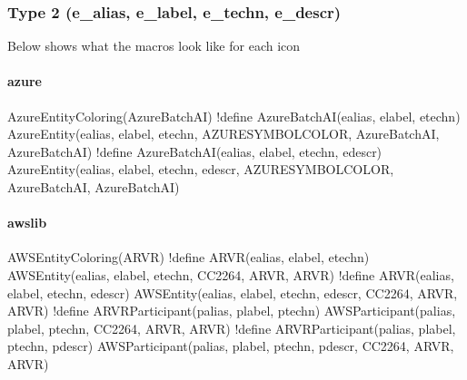 \documentclass[letterpaper,10pt,english]{sphinxmanual}
\begin{document}
\subsubsection{Type 2 (e\_alias, e\_label, e\_techn, e\_descr)}
\label{\detokenize{Stdlib/StdLibOverview:type-2-e-alias-e-label-e-techn-e-descr}}
Below shows what the macros look like for each icon


\paragraph{azure}
\label{\detokenize{Stdlib/StdLibOverview:azure}}

\begin{sphinxVerbatim}[commandchars=\\\{\}]
AzureEntityColoring(AzureBatchAI)
!define AzureBatchAI(e\PYGZus{}alias, e\PYGZus{}label, e\PYGZus{}techn) AzureEntity(e\PYGZus{}alias, e\PYGZus{}label, e\PYGZus{}techn, AZURE\PYGZus{}SYMBOL\PYGZus{}COLOR, AzureBatchAI, AzureBatchAI)
!define AzureBatchAI(e\PYGZus{}alias, e\PYGZus{}label, e\PYGZus{}techn, e\PYGZus{}descr) AzureEntity(e\PYGZus{}alias, e\PYGZus{}label, e\PYGZus{}techn, e\PYGZus{}descr, AZURE\PYGZus{}SYMBOL\PYGZus{}COLOR, AzureBatchAI, AzureBatchAI)
\end{sphinxVerbatim}


\paragraph{awslib}
\label{\detokenize{Stdlib/StdLibOverview:awslib}}

\begin{sphinxVerbatim}[commandchars=\\\{\}]
AWSEntityColoring(ARVR)
!define ARVR(e\PYGZus{}alias, e\PYGZus{}label, e\PYGZus{}techn) AWSEntity(e\PYGZus{}alias, e\PYGZus{}label, e\PYGZus{}techn, \PYGZsh{}CC2264, ARVR, ARVR)
!define ARVR(e\PYGZus{}alias, e\PYGZus{}label, e\PYGZus{}techn, e\PYGZus{}descr) AWSEntity(e\PYGZus{}alias, e\PYGZus{}label, e\PYGZus{}techn, e\PYGZus{}descr, \PYGZsh{}CC2264, ARVR, ARVR)
!define ARVRParticipant(p\PYGZus{}alias, p\PYGZus{}label, p\PYGZus{}techn) AWSParticipant(p\PYGZus{}alias, p\PYGZus{}label, p\PYGZus{}techn, \PYGZsh{}CC2264, ARVR, ARVR)
!define ARVRParticipant(p\PYGZus{}alias, p\PYGZus{}label, p\PYGZus{}techn, p\PYGZus{}descr) AWSParticipant(p\PYGZus{}alias, p\PYGZus{}label, p\PYGZus{}techn, p\PYGZus{}descr, \PYGZsh{}CC2264, ARVR, ARVR)
\end{sphinxVerbatim}
\end{document}
